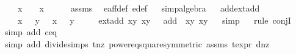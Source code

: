 \begin{isabellebody}
\ \ \ {\isachardoublequoteopen}x\ {\isacharequal}\ {}\ {\isasymor}\ x\ {\isacharequal}\ {\isacharminus}{}{\isachardoublequoteclose}\isanewline
%
\isadelimproof
\ \ %
\endisadelimproof
%
\isatagproof
{}\isamarkupfalse%
\ assms\ \isamarkupfalse%
\ e{\isacharunderscore}aff{\isacharunderscore}def\ e{\isacharprime}{\isacharunderscore}def\isanewline
\ \ \isamarkupfalse%
{\isacharparenleft}simp{\isacharcomma}algebra{\isacharparenright}%
\endisatagproof
{\isafoldproof}%
%
\isadelimproof
\ \isanewline
%
\endisadelimproof
\isanewline
{}\isamarkupfalse%
\ add{\isacharunderscore}ext{\isacharunderscore}add{\isacharcolon}\isanewline
\ \ \ {\isachardoublequoteopen}x{}\ {\isasymnoteq}\ {}{\isachardoublequoteclose}\ {\isachardoublequoteopen}y{}\ {\isasymnoteq}\ {}{\isachardoublequoteclose}\ {\isachardoublequoteopen}x{}\ {\isasymnoteq}\ {}{\isachardoublequoteclose}\ {\isachardoublequoteopen}y{}\ {\isasymnoteq}\ {}{\isachardoublequoteclose}\isanewline
\ \ \ {\isachardoublequoteopen}ext{\isacharunderscore}add\ {\isacharparenleft}x{}{\isacharcomma}y{}{\isacharparenright}\ {\isacharparenleft}x{}{\isacharcomma}y{}{\isacharparenright}\ {\isacharequal}\ {\isasymtau}\ {\isacharparenleft}add\ {\isacharparenleft}{\isasymtau}\ {\isacharparenleft}x{}{\isacharcomma}y{}{\isacharparenright}{\isacharparenright}\ {\isacharparenleft}x{}{\isacharcomma}y{}{\isacharparenright}{\isacharparenright}{\isachardoublequoteclose}\isanewline
%
\isadelimproof
\ \ %
\endisadelimproof
%
\isatagproof
{}\isamarkupfalse%
{\isacharparenleft}simp{\isacharparenright}\isanewline
\ \ \isamarkupfalse%
{\isacharparenleft}rule\ conjI{\isacharparenright}\isanewline
\ \ \isamarkupfalse%
{\isacharparenleft}simp\ add{\isacharcolon}\ c{\isacharunderscore}eq{\isacharunderscore}{}{\isacharparenright}\isanewline
\ \ \isamarkupfalse%
{\isacharparenleft}simp\ add{\isacharcolon}\ divide{\isacharunderscore}simps\ t{\isacharunderscore}nz\ power{}{\isacharunderscore}eq{\isacharunderscore}square{\isacharbrackleft}symmetric{\isacharbrackright}\ assms\ t{\isacharunderscore}expr{\isacharparenleft}{}{\isacharparenright}\ d{\isacharunderscore}nz{\isacharparenright}\isanewline
\ \ \isamarkupfalse%

\end{isabellebody}
